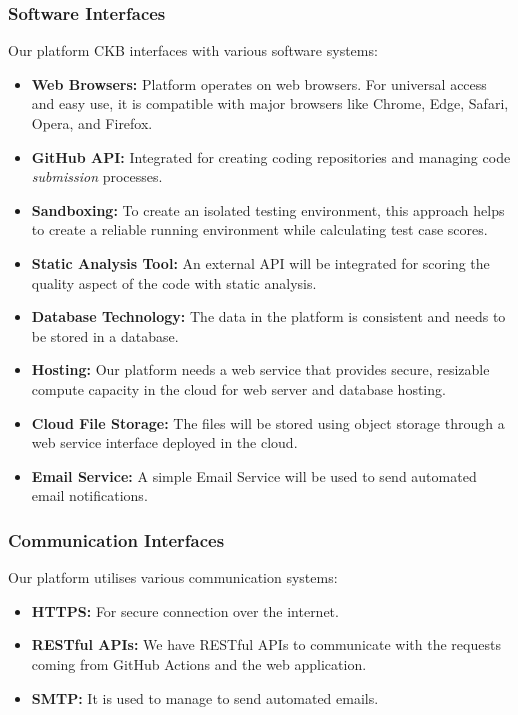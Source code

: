\subsubsection{Software Interfaces}
Our platform CKB interfaces with various software systems:

\begin{itemize}
    \item \textbf{Web Browsers:} Platform operates on web browsers. For universal access and easy use, it is compatible with major browsers like Chrome, Edge, Safari, Opera, and Firefox.

    \item \textbf{GitHub API:} Integrated for creating coding repositories and managing code \textit{submission} processes.

    \item \textbf{Sandboxing:} To create an isolated testing environment, this approach helps to create a reliable running environment while calculating test case scores.

    \item \textbf{Static Analysis Tool:} An external API will be integrated for scoring the quality aspect of the code with static analysis. 

    \item \textbf{Database Technology:} The data in the platform is consistent and needs to be stored in a database.

    \item \textbf{Hosting:} Our platform needs a web service that provides secure, resizable compute capacity in the cloud for web server and database hosting.

    \item \textbf{Cloud File Storage:} The files will be stored using object storage through a web service interface deployed in the cloud.
    \item \textbf{Email Service:} A simple Email Service will be used to send automated email notifications.
\end{itemize}

\subsubsection{Communication Interfaces}
Our platform utilises various communication systems:

\begin{itemize}
    \item \textbf{HTTPS:} For secure connection over the internet.

    \item \textbf{RESTful APIs:} We have RESTful APIs to communicate with the requests coming from GitHub Actions and the web application.

    \item \textbf{SMTP:} It is used to manage to send automated emails.
\end{itemize}


